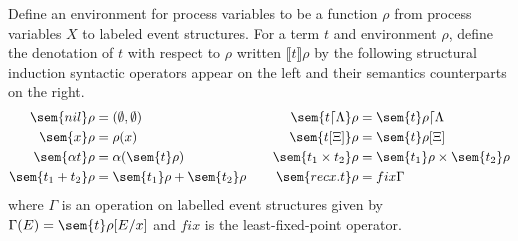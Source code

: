\begin{definition}
    Define an environment for process variables to be a function $\rho$
    from process variables $X$ to labeled event structures.
    For a term $t$ and environment $\rho$, define the denotation of $t$ with
    respect to $\rho$ written $\llbracket t \rrbracket \rho$ by the following
    structural induction syntactic operators appear on the left and their
    semantics counterparts on the right.
    \begin{equation*}
        \begin{aligned}[c]
            \sem{nil}\rho       & = (\emptyset,\emptyset)         \\
            \sem{x}\rho         & = \rho(x)                       \\
            \sem{\alpha t}\rho  & = \alpha(\sem{t}\rho)           \\
            \sem{t_1 + t_2}\rho & = \sem{t_1}\rho + \sem{t_2}\rho \\
        \end{aligned}
        \qquad
        \begin{aligned}[c]
            \sem{t\lceil \Lambda}\rho & = \sem{t}\rho \lceil \Lambda         \\
            \sem{t[\Xi]}\rho          & = \sem{t}\rho[\Xi]                   \\
            \sem{t_1 \times t_2}\rho  & = \sem{t_1}\rho \times \sem{t_2}\rho \\
            \sem{recx.t}\rho          & = fix\Gamma                          \\
        \end{aligned}
    \end{equation*}
    where $\Gamma$ is an operation on labelled event structures given by
    $\Gamma(E) = \sem{t}\rho[E / x]$ and $fix$ is the least-fixed-point operator.
\end{definition}
